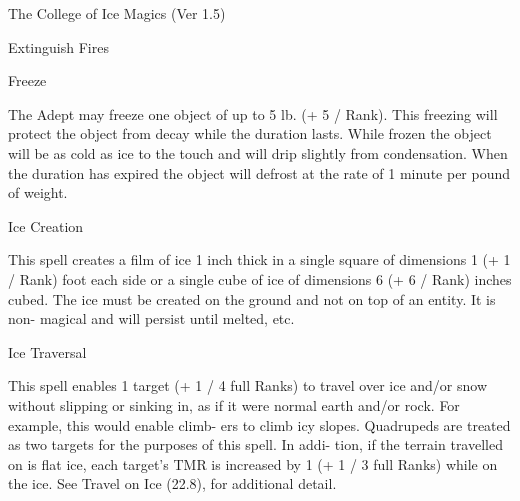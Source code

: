 \begin{Chapter}{The College of Ice Magics (Ver 1.5)}
\begin{spell}[G-1]{Extinguish Fires }
\begin{effects}
\end{effects}
\end{spell}

\begin{spell}[G-2]{Freeze }

\begin{effects}
The Adept may freeze  one object of up to 
5  lb.  (+  5  /  Rank).  This  freezing  will  protect  the 
object  from  decay  while  the  duration  lasts.  While 
frozen the object will be as cold as ice to the touch 
and will drip slightly from condensation. When the 
duration  has  expired  the  object  will  defrost  at  the 
rate of 1 minute per pound of weight. 

\end{effects}
\end{spell}

\begin{spell}[G-3]{Ice Creation }

\begin{effects}
This spell creates a film of ice 1 inch thick 
in a single square of dimensions 1 (+ 1 / Rank) foot 
each side or a single cube of ice of dimensions 6 (+ 
6 / Rank) inches cubed. The ice must be created on 
the  ground  and  not  on  top  of  an  entity.  It  is  non-
magical and will persist until melted, etc. 

\end{effects}
\end{spell}

\begin{spell}[G-4]{Ice Traversal }

\begin{effects}
 This  spell  enables  1  target  (+  1  /  4  full 
Ranks)  to  travel  over  ice  and/or  snow  without 
slipping  or  sinking  in,  as  if  it  were  normal  earth 
and/or rock. For example, this would enable climb-
ers  to  climb  icy  slopes.  Quadrupeds  are  treated  as 
two  targets  for  the  purposes  of  this  spell.  In  addi-
tion,  if  the  terrain  travelled  on  is  flat  ice,  each 
target’s TMR is increased by 1 (+ 1 / 3 full Ranks) 
while  on  the  ice.  See  Travel  on  Ice  (22.8),  for 
additional detail. 


\end{effects}
\end{spell}
\end{Chapter}
